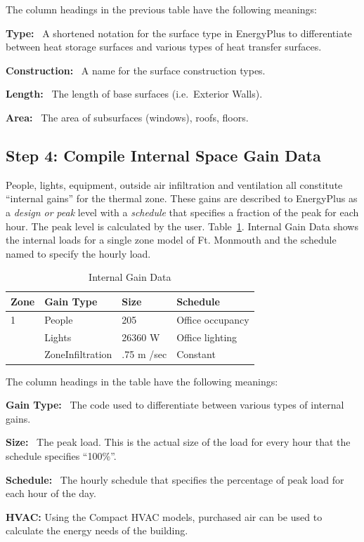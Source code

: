 The column headings in the previous table have the following meanings:

\textbf{Type:}~ A shortened notation for the surface type in EnergyPlus to differentiate between heat storage surfaces and various types of heat transfer surfaces.

\textbf{Construction:}~ A name for the surface construction types.

\textbf{Length:}~ The length of base surfaces (i.e.~Exterior Walls).

\textbf{Area:}~ The area of subsurfaces (windows), roofs, floors.

\subsection{Step 4: Compile Internal Space Gain Data}\label{step-4-compile-internal-space-gain-data}

People, lights, equipment, outside air infiltration and ventilation all constitute ``internal gains'' for the thermal zone. These gains are described to EnergyPlus as a \emph{design or} \emph{peak} level with a \emph{schedule} that specifies a fraction of the peak for each hour. The peak level is calculated by the user. Table~\ref{table:internal-gain-data}. Internal Gain Data shows the internal loads for a single zone model of Ft. Monmouth and the schedule named to specify the hourly load.

\begin{longtable}[c]{@{}llll@{}}
\caption{Internal Gain Data \protect \label{table:internal-gain-data}}\\
\toprule 
Zone & Gain Type & Size & Schedule \tabularnewline \midrule
\endhead
1 & People & 205 & Office occupancy \tabularnewline
~ & Lights & 26360 W & Office lighting \tabularnewline
~ & ZoneInfiltration & .75 m  /sec & Constant \tabularnewline
\bottomrule
\end{longtable}

The column headings in the table have the following meanings:

\textbf{Gain Type:}~ The code used to differentiate between various types of internal gains.

\textbf{Size:}~ The peak load. This is the actual size of the load for every hour that the schedule specifies ``100\%''.

\textbf{Schedule:}~ The hourly schedule that specifies the percentage of peak load for each hour of the day.

\textbf{HVAC:} Using the Compact HVAC models, purchased air can be used to calculate the energy needs of the building.

